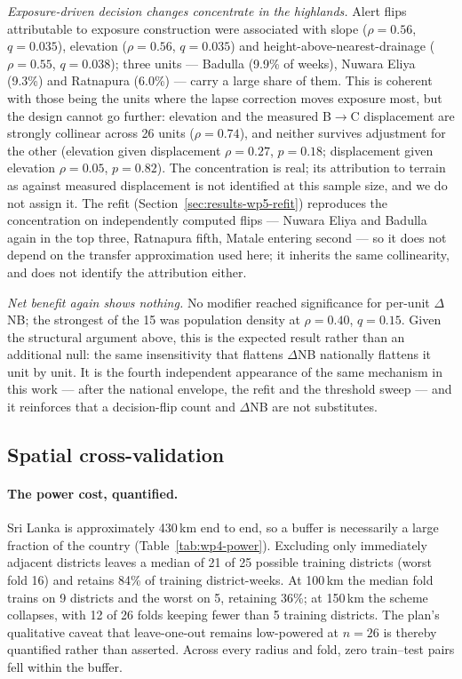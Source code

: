 \emph{Exposure-driven decision changes concentrate in the highlands.} Alert flips attributable to exposure construction were associated with slope ($\rho=0.56$, $q=0.035$), elevation ($\rho=0.56$, $q=0.035$) and height-above-nearest-drainage ($\rho=0.55$, $q=0.038$); three units --- Badulla (9.9\% of weeks), Nuwara Eliya (9.3\%) and Ratnapura (6.0\%) --- carry a large share of them. This is coherent with those being the units where the lapse correction moves exposure most, but the design cannot go further: elevation and the measured B$\to$C displacement are strongly collinear across 26 units ($\rho=0.74$), and neither survives adjustment for the other (elevation given displacement $\rho=0.27$, $p=0.18$; displacement given elevation $\rho=0.05$, $p=0.82$). The concentration is real; its attribution to terrain as against measured displacement is not identified at this sample size, and we do not assign it. The refit (Section~\ref{sec:results-wp5-refit}) reproduces the concentration on independently computed flips --- Nuwara Eliya and Badulla again in the top three, Ratnapura fifth, Matale entering second --- so it does not depend on the transfer approximation used here; it inherits the same collinearity, and does not identify the attribution either.

\emph{Net benefit again shows nothing.} No modifier reached significance for per-unit $\Delta$NB; the strongest of the 15 was population density at $\rho=0.40$, $q=0.15$. Given the structural argument above, this is the expected result rather than an additional null: the same insensitivity that flattens $\Delta$NB nationally flattens it unit by unit. It is the fourth independent appearance of the same mechanism in this work --- after the national envelope, the refit and the threshold sweep --- and it reinforces that a decision-flip count and $\Delta$NB are not substitutes.

\subsection{Spatial cross-validation}
\label{sec:results-wp4}

\paragraph{The power cost, quantified.} Sri Lanka is approximately 430\,km end to end, so a buffer is necessarily a large fraction of the country (Table~\ref{tab:wp4-power}). Excluding only immediately adjacent districts leaves a median of 21 of 25 possible training districts (worst fold 16) and retains 84\% of training district-weeks. At 100\,km the median fold trains on 9 districts and the worst on 5, retaining 36\%; at 150\,km the scheme collapses, with 12 of 26 folds keeping fewer than 5 training districts. The plan's qualitative caveat that leave-one-out remains low-powered at $n=26$ is thereby quantified rather than asserted. Across every radius and fold, zero train--test pairs fell within the buffer.

